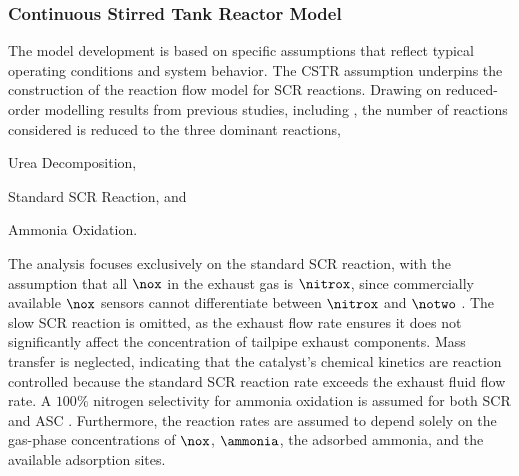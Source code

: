 \subsubsection{Continuous Stirred Tank Reactor Model}
The model development is based on specific assumptions that reflect typical operating conditions and system behavior.
The CSTR assumption underpins the construction of the reaction flow model for SCR reactions. Drawing on reduced-order
modelling results from previous studies, including \cite{devarakonda2008adequacy,jain2023diagnostics}, the number of
reactions considered is reduced to the three dominant reactions,
\begin{inparaenum}[(1)]
    \item Urea Decomposition,
    \item Standard SCR Reaction, and
    \item Ammonia Oxidation.
\end{inparaenum}
The analysis focuses exclusively on the standard SCR reaction, with the assumption that all $\nox$ in the exhaust gas is
$\nitrox$, since commercially available $\nox$ sensors cannot differentiate between $\nitrox$ and $\notwo$ \cite{nova2014urea}. The
slow SCR reaction is omitted, as the exhaust flow rate ensures it does not significantly affect the concentration of
tailpipe exhaust components. Mass transfer is neglected, indicating that the catalyst's chemical kinetics are reaction
controlled because the standard SCR reaction rate exceeds the exhaust fluid flow rate. A $100\%$ nitrogen selectivity
for ammonia oxidation is assumed for both SCR and ASC \cite{jain2023diagnostics}. Furthermore, the reaction rates are
assumed to depend solely on the gas-phase concentrations of $\nox$, $\ammonia$, the adsorbed ammonia, and the available
adsorption sites.

